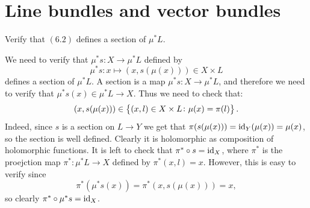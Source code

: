\documentclass[11pt, a4paper]{article}
\begin{document}
\newpage

\section{Line bundles and vector bundles}

\begin{exercise}
  Verify that $(6.2)$ defines a section of $\mu^*L$.
\end{exercise}
\begin{solution}
  We need to verify that $\mu^*s \colon X \to \mu^*L$ defined by
  \[
    \mu^*s \colon x \mapsto (x,s(\mu(x))) \in X \times L
  \]
  defines a section of $\mu^*L$.
  A section is a map $\mu^*s \colon X \to \mu^*L$,
  and therefore we need to verify that $\mu^*s(x) \in \mu^*L \to X$.
  Thus we need to check that:
  \[
    (x,s(\mu(x))) \in
    \left\{(x,l) \in X \times L \colon \mu(x) = \pi(l)\right\}.
  \]
  Indeed, since $s$ is a section on $L \to Y$ we get that
  $\pi(s(\mu(x))) = \operatorname{id}_Y(\mu(x)) = \mu(x)$,
  so the section is well defined.
  Clearly it is holomorphic as composition of holomorphic functions.
  It is left to check that $\pi^* \circ s = \operatorname{id}_X$,
  where $\pi^*$ is the proejction map $\pi^* \colon \mu^*L \to X$
  defined by $\pi^*(x,l) = x$.
  However, this is easy to verify since
  \[
    \pi^*(\mu^*s(x)) =
    \pi^*(x,s(\mu(x))) = x,
  \]
  so clearly $\pi^* \circ \mu^*s = \operatorname{id}_X$.
\end{solution}
\end{document}
